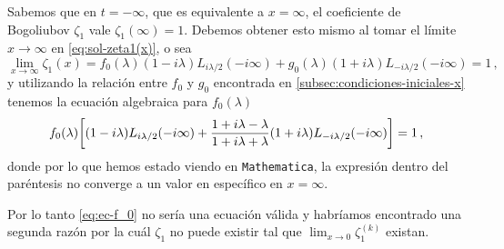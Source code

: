 \documentclass[%
 aip,
 jmp,%
 amsmath,amssymb,
 reprint,%
]{revtex4-2}
\begin{document}
{Sabemos que en $t=-\infty$, que es equivalente a $x=\infty$, el coeficiente de Bogoliubov $\zeta_1$ vale $\zeta_1(\infty)=1$. Debemos obtener esto mismo al tomar el límite $x\to\infty$ en \eqref{eq:sol-zeta1(x)}, o sea
\begin{equation}
    \lim_{x\to\infty}\zeta_1(x)=f_0(\lambda)(1-i\lambda)L_{i\lambda/2}(-i\infty) + g_0(\lambda)(1+i\lambda)L_{-i\lambda/2}(-i\infty)=1\,,
\end{equation}
y utilizando la relación entre $f_0$ y $g_0$ encontrada en \ref{subsec:condiciones-iniciales-x} tenemos la ecuación algebraica para $f_0(\lambda)$
\begin{equation}\label{eq:ec-f_0}
    f_0(\lambda)\qty[(1-i\lambda)L_{i\lambda/2}(-i\infty) +\frac{1+i\lambda-\lambda}{1+i\lambda+\lambda}(1+i\lambda)L_{-i\lambda/2}(-i\infty)]=1\,,
\end{equation}
donde por lo que hemos estado viendo en \texttt{Mathematica}, la expresión dentro del paréntesis no converge a un valor en específico en $x=\infty$.

Por lo tanto \eqref{eq:ec-f_0} no sería una ecuación válida y habríamos encontrado una segunda razón por la cuál $\zeta_1$ no puede existir tal que $\lim_{x \to 0}\zeta_1^{(k)}$ existan.
}
\end{document}
